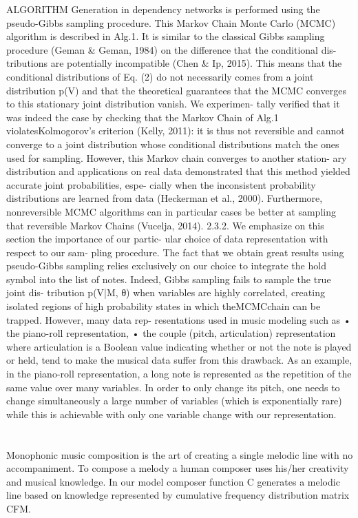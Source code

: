 \cite{Hadjeres2016} ALGORITHM Generation in dependency networks is performed using the pseudo-Gibbs sampling procedure. This Markov Chain Monte Carlo (MCMC) algorithm is described in Alg.1. It is similar to the classical Gibbs sampling procedure (Geman & Geman, 1984) on the difference that the conditional dis- tributions are potentially incompatible (Chen & Ip, 2015). This means that the conditional distributions of Eq. (2) do not necessarily comes from a joint distribution p(V) and that the theoretical guarantees that the MCMC converges to this stationary joint distribution vanish. We experimen- tally verified that it was indeed the case by checking that the Markov Chain of Alg.1 violatesKolmogorov’s criterion (Kelly, 2011): it is thus not reversible and cannot converge to a joint distribution whose conditional distributions match the ones used for sampling. However, this Markov chain converges to another station- ary distribution and applications on real data demonstrated that this method yielded accurate joint probabilities, espe- cially when the inconsistent probability distributions are learned from data (Heckerman et al., 2000). Furthermore, nonreversible MCMC algorithms can in particular cases be better at sampling that reversible Markov Chains (Vucelja, 2014). 2.3.2. We emphasize on this section the importance of our partic- ular choice of data representation with respect to our sam- pling procedure. The fact that we obtain great results using pseudo-Gibbs sampling relies exclusively on our choice to integrate the hold symbol into the list of notes. Indeed, Gibbs sampling fails to sample the true joint dis-
tribution p(V|M, θ) when variables are highly correlated, creating isolated regions of high probability states in which theMCMCchain can be trapped. However, many data rep- resentations used in music modeling such as
• the piano-roll representation,
• the couple (pitch, articulation) representation where articulation is a Boolean value indicating whether or not the note is played or held,
tend to make the musical data suffer from this drawback.
As an example, in the piano-roll representation, a long note is represented as the repetition of the same value over many variables. In order to only change its pitch, one needs to change simultaneously a large number of variables (which is exponentially rare) while this is achievable with only one variable change with our representation.

\chapter{}
Monophonic music composition is the art of creating a single melodic line with no accompaniment. To compose a melody a human composer uses his/her creativity and musical knowledge. In our model composer function C generates a melodic line based on knowledge represented by cumulative frequency distribution matrix CFM.

